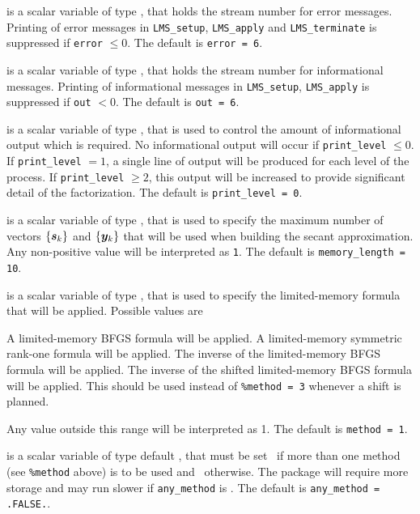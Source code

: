 \documentclass{galahad}
\newcommand{\packagename}{LMS}
\begin{document}
\begin{description}

 is a scalar variable of type \integer, that holds the
stream number for error messages. Printing of error messages in
{\tt \packagename\_setup}, {\tt \packagename\_apply}
and {\tt \packagename\_terminate}
is suppressed if {\tt error} $\leq 0$.
The default is {\tt error = 6}.

 is a scalar variable of type \integer, that holds the
stream number for informational messages. Printing of informational messages in
{\tt \packagename\_setup}, {\tt \packagename\_apply}
is suppressed if {\tt out} $< 0$.
The default is {\tt out = 6}.

 is a scalar variable of type \integer, that is used
to control the amount of informational output which is required. No
informational output will occur if {\tt print\_level} $\leq 0$. If
{\tt print\_level} $= 1$, a single line of output will be produced for each
level of the process. If {\tt print\_level} $\geq 2$, this output will be
increased to provide significant detail of the factorization.
The default is {\tt print\_level = 0}.

 is a scalar variable of type \integer, that is used
to specify the maximum number of vectors  $\{{\bm{s}}_k\}$ and $\{{\bm{y}}_k\}$
that will be used when building the secant approximation.
Any non-positive value will be interpreted as {\tt 1}.
The default is {\tt memory\_length = 10}.

 is a scalar variable of type \integer, that is used
to specify the limited-memory formula that will be applied. Possible
values are
\begin{description}
 A limited-memory BFGS formula will be applied.
 A limited-memory symmetric rank-one formula will be applied.
 The inverse of the limited-memory BFGS formula will be applied.
 The inverse of the shifted limited-memory BFGS formula will be applied.
This should be used instead of {\tt \%method = 3} whenever a shift is
planned.
\end{description}
Any value outside this range will be interpreted as {1}.
The default is {\tt method = 1}.

 is a scalar variable of type default \logical,
that must be set \true\ if more than one method (see {\tt \%method} above)
is to be used and  \false\ otherwise. The package will require more
storage and may run slower if {\tt any\_method} is \true.
The default is {\tt any\_method = .FALSE.}.


\end{description}
\end{document}

